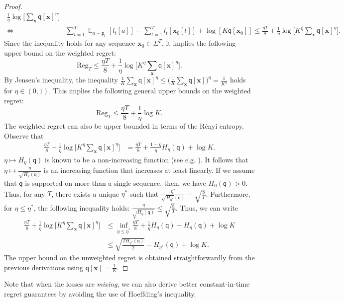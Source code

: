 \documentclass{article}
\DeclareMathOperator*{\E}{\mathbb E}
\newcommand{\bx}{{\mathbf x}}
\newcommand{\sfp}{{\mathsf p}}
\newcommand{\sfq}{{\mathsf q}}
\newcommand{\Reg}{\mathrm{Reg}}
\begin{document}
\begin{proof}
\begin{align*}
    \frac{1}{\eta} \log \Big[ \sum_{\bx} \sfq[\bx]^\eta \Big]\\
  \Leftrightarrow & \sum_{t = 1}^T \E_{a \sim \sfp_t} \left[l_t[a]
    \right] - \sum_{t = 1}^T l_t[\bx_0[t]] + \log[K \sfq[\bx_0] ]
\leq \frac{\eta T}{8} + \frac{1}{\eta} \log \Big[ K^\eta \sum_{\bx} \sfq[\bx]^\eta \Big].
\end{align*}
Since the inequality holds for any sequence $\bx_0 \in \Sigma^T$, it
implies the following upper bound on the weighted regret:
\begin{equation*}
  \Reg_T 
  \leq \frac{\eta T}{8} + \frac{1}{\eta} \log \Big[ K^\eta \sum_{\bx} \sfq[\bx]^\eta \Big].
\end{equation*}
By Jensen's inequality, the inequality
$\frac{1}{K}\sum_{\bx} \sfq[\bx]^\eta \leq \Big(\frac{1}{K}\sum_{\bx}
\sfq[\bx] \Big)^\eta = \frac{1}{K^\eta}$ holds for $\eta \in (0,
1)$. This implies the following general upper bounds on the weighted
regret:
\begin{equation*}
  \Reg_T 
  \leq \frac{\eta T}{8} + \frac{1}{\eta} \log K.
\end{equation*}
The weighted regret can also be upper bounded in terms of
the R\'enyi entropy. Observe that
\begin{align*}
\frac{\eta T}{8} + \frac{1}{\eta} \log \Big[ K^\eta \sum_{\bx}
  \sfq[\bx]^\eta \Big]
  & = \frac{\eta T}{8} + \frac{1-\eta}{\eta} H_\eta(\sfq) + \log K.
\end{align*}
$\eta \mapsto H_\eta(\sfq)$ is known to be a non-increasing function
(see e.g. \citep{VanErvenHarremos2014}). It follows that
$\eta \mapsto \frac{\eta}{\sqrt{H_\eta}(\sfq)}$ is an increasing
function that increases at least linearly. If we assume that $\sfq$ is
supported on more than a single sequence, then, we have
$H_0(\sfq) > 0$. Thus, for any $T$, there exists a unique $\eta^*$
such that
$\frac{\eta^*}{\sqrt{H_{\eta^*}}(\sfq)} = \sqrt{\frac{8}{T}}$.
Furthermore, for $\eta \leq \eta^*$, the following inequality holds:
$\frac{\eta}{\sqrt{H_\eta(\sfq)}} \leq \sqrt{\frac{8}{T}}$. Thus, we
can write
\begin{align*}
  \frac{\eta T}{8} + \frac{1}{\eta} \log \Big[ K^\eta \sum_{\bx}
  \sfq[\bx]^\eta \Big]
  & \leq \inf_{\eta \leq \eta^*} \frac{\eta T}{8} + \frac{1}{\eta}
    H_\eta(\sfq) - H_\eta(\sfq) + \log K \\
  & \leq \sqrt{\frac{T H_{\eta^*}(\sfq)}{2}} - H_{\eta^*}(\sfq) + \log
    K.
\end{align*}
The upper bound on the unweighted regret is obtained straightforwardly
from the previous derivations using $\sfq[\bx] = \frac{1}{K}$.
\end{proof}
Note that when the losses are \emph{mixing}, we can also derive better 
constant-in-time regret guarantees by avoiding the use of Hoeffding's 
inequality.
\end{document}
